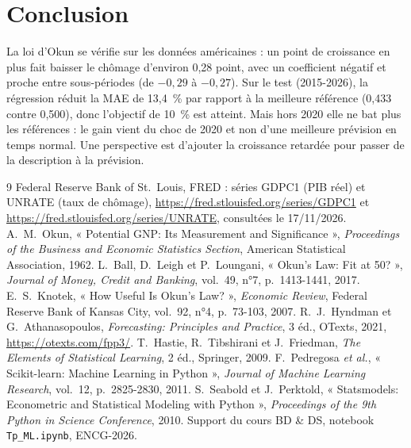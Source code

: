 \documentclass[11pt,a4paper]{article}
\begin{document}
\section{Conclusion}
\label{sec:conclusion}
La loi d'Okun se vérifie sur les données américaines : un point de croissance en plus fait baisser le chômage d'environ 0,28 point, avec un coefficient négatif et proche entre sous-périodes (de $-0{,}29$ à $-0{,}27$). Sur le test (2015-2026), la régression réduit la MAE de 13,4~\% par rapport à la meilleure référence (0,433 contre 0,500), donc l'objectif de 10~\% est atteint. Mais hors 2020 elle ne bat plus les références : le gain vient du choc de 2020 et non d'une meilleure prévision en temps normal. Une perspective est d'ajouter la croissance retardée pour passer de la description à la prévision.

\begin{thebibliography}{9}
   Federal Reserve Bank of St.~Louis, FRED : séries GDPC1 (PIB réel) et UNRATE (taux de chômage), \url{https://fred.stlouisfed.org/series/GDPC1} et \url{https://fred.stlouisfed.org/series/UNRATE}, consultées le 17/11/2026.
   A.~M.~Okun, « Potential GNP: Its Measurement and Significance », \textit{Proceedings of the Business and Economic Statistics Section}, American Statistical Association, 1962.
   L.~Ball, D.~Leigh et P.~Loungani, « Okun's Law: Fit at 50? », \textit{Journal of Money, Credit and Banking}, vol.~49, n°7, p.~1413-1441, 2017.
   E.~S.~Knotek, « How Useful Is Okun's Law? », \textit{Economic Review}, Federal Reserve Bank of Kansas City, vol.~92, n°4, p.~73-103, 2007.
   R.~J.~Hyndman et G.~Athanasopoulos, \textit{Forecasting: Principles and Practice}, 3\ieme{} éd., OTexts, 2021, \url{https://otexts.com/fpp3/}.
   T.~Hastie, R.~Tibshirani et J.~Friedman, \textit{The Elements of Statistical Learning}, 2\ieme{} éd., Springer, 2009.
   F.~Pedregosa \textit{et al.}, « Scikit-learn: Machine Learning in Python », \textit{Journal of Machine Learning Research}, vol.~12, p.~2825-2830, 2011.
   S.~Seabold et J.~Perktold, « Statsmodels: Econometric and Statistical Modeling with Python », \textit{Proceedings of the 9th Python in Science Conference}, 2010.
   Support du cours BD \& DS, notebook \texttt{Tp\_ML.ipynb}, ENCG-2026.
\end{thebibliography}
\end{document}
